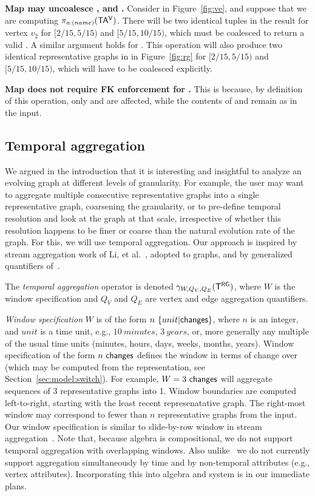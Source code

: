 {\bf Map may uncoalesce \tav, \tae and \trg.}  Consider
 in Figure~\ref{fig:ve}, and suppose that we are computing
$\pi_{a:(name)} (\mathsf{TA^{V}})$.  There will be two identical tuples in the
result for vertex $v_2$ for $[2/15, 5/15)$ and $[5/15, 10/15)$, which
    must be coalesced to return a valid \tav.  A similar argument
    holds for \tae. This operation will also produce two identical
    representative graphs in \trg in Figure~\ref{fig:rg} for $[2/15,
      5/15)$ and $[5/15, 10/15)$, which will have to be coalesced
        explicitly.

{\bf Map does not require FK enforcement for \tve.}  This is because,
by definition of this operation, only \tav and \tae are affected,
while the contents of \tv and \te remain as in the input.

\subsection{Temporal aggregation}
\label{sec:algebra:agg}

We argued in the introduction that it is interesting and insightful to
analyze an evolving graph at different levels of granularity.  For
example, the user may want to aggregate multiple consecutive
representative graphs into a single representative graph, coarsening
the granularity, or to pre-define temporal resolution and look at the
graph at that scale, irrespective of whether this resolution happens
to be finer or coarse than the natural evolution rate of the graph.
For this, we will use temporal aggregation.  Our approach is inspired
by stream aggregation work of Li, et al.~\cite{Li2005}, adopted to
graphs, and by generalized quantifiers of~\cite{Hsu1995}.


The {\em temporal aggregation} operator is denoted $\gamma_{W,Q_V,Q_E}
(\mathsf{T^{RG}})$, where $W$ is the window specification and $Q_V$ and $Q_E$ are
vertex and edge aggregation quantifiers.  

{\em Window specification} $W$ is of the form
$n~\{unit|\textsf{changes}\}$, where $n$ is an integer, and $unit$ is a
time unit, e.g., $10~minutes$, $3~years$, or, more generally any
multiple of the usual time units (minutes, hours, days, weeks, months,
years).  Window specification of the form $n~\textsf{changes}$ defines
the window in terms of change over \trg (which may be computed from
the \tve representation, see Section~\ref{sec:model:switch}).  For
example, $W=3~\textsf{changes}$ will aggregate sequences of 3
representative graphs into 1.  Window boundaries are computed
left-to-right, starting with the least recent represenatative graph.
The right-most window may correspond to fewer than $n$ representative
graphs from the input.
%
Our window specification is similar to slide-by-row window in stream
aggregation~\cite{Li2005}.  Note that, because \tg algebra is
compositional, we do not support temporal aggregation with overlapping
windows. Also unlike~\cite{Li2005} we do not currently support
aggregation simultaneously by time and by non-temporal attributes
(e.g., vertex attributes). Incorporating this into \tg algebra and \ql
system is in our immediate plans.

